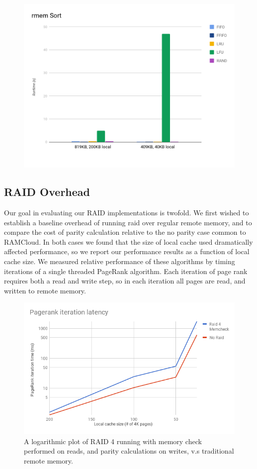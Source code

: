 \begin{figure}[H]
    \includegraphics[width=\columnwidth]{fig/sortPerformance}
    \caption{}
    \label{fig:sortPerformance}
\end{figure}

\subsection{RAID Overhead}

Our goal in evaluating our RAID implementations is twofold. We first
wished to establish a baseline overhead of running raid over regular
remote memory, and to compare the cost of parity calculation relative
to the no parity case common to RAMCloud. In both cases we found that
the size of local cache used dramatically affected performance, so we
report our performance results as a function of local cache size. We
measured relative performance of these algorithms by timing
iterations of a single threaded PageRank algorithm. Each iteration
of page rank requires both a read and write step, so in each
iteration all pages are read, and written to remote memory.

\begin{figure}[H]
    \includegraphics[width=\columnwidth]{fig/Raid4Overhead}
    \caption{A logarithmic plot of RAID 4 running with memory check performed on reads, and parity calculations on writes, v.s traditional remote memory.}
    \label{fig:raid4Overhead}
\end{figure}

